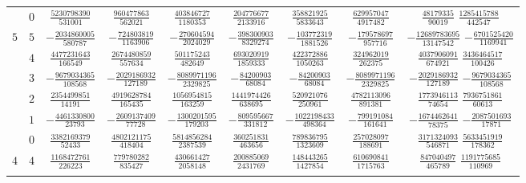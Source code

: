 \begin{table}
\begin{center}
\begin{tabular}{ccccccccc}
           &  $0$  &  $ \frac{ 5230798390}{ 531001}$  &  $ \frac{  960477863}{  562021}$  &  $ \frac{ 403846727}{ 1180353}$  &  $ \frac{ 204776677}{ 2133916}$  &  $ \frac{ 358821925}{ 5833643}$  &  $ \frac{ 629957047}{ 4917482} $  &  $ \frac{   48179335}{   90019}$  $ \frac{ 1285415788}{ 442547}$  \\ \addlinespace
      $5$  &  $5$  &  $-\frac{ 2034860005}{ 580787}$  &  $-\frac{  724803819}{ 1163906}$  &  $-\frac{ 270604594}{ 2024029}$  &  $-\frac{ 398300903}{ 8329274}$  &  $-\frac{ 103772319}{ 1881526}$  &  $-\frac{ 179578697}{  957716} $  &  $-\frac{12689783695}{13147542}$  $-\frac{ 6701525420}{1169941}$  \\ \addlinespace
           &  $4$  &  $ \frac{ 4477231643}{ 166549}$  &  $ \frac{ 2674480859}{  557634}$  &  $ \frac{ 501175243}{  482649}$  &  $ \frac{ 693020919}{ 1859333}$  &  $ \frac{ 422372886}{ 1050263}$  &  $ \frac{ 324962019}{  262375} $  &  $ \frac{ 4037906091}{  674921}$  $ \frac{ 3436464517}{ 100426}$  \\ \addlinespace
           &  $3$  &  $-\frac{ 9679034365}{ 108568}$  &  $-\frac{ 2029186932}{  127189}$  &  $-\frac{8089971196}{ 2329825}$  &  $-\frac{  84200903}{   68084}$  &  $-\frac{  84200903}{   68084}$  &  $-\frac{8089971196}{ 2329825} $  &  $-\frac{ 2029186932}{  127189}$  $-\frac{ 9679034365}{ 108568}$  \\ \addlinespace
           &  $2$  &  $ \frac{ 2354499851}{  14191}$  &  $ \frac{ 4919628784}{  165435}$  &  $ \frac{1056954815}{  163259}$  &  $ \frac{1441974426}{  638695}$  &  $ \frac{ 520921076}{  250961}$  &  $ \frac{4782113096}{  891381} $  &  $ \frac{ 1773946113}{   74654}$  $ \frac{ 7936751861}{  60613}$  \\ \addlinespace
           &  $1$  &  $-\frac{ 4461330800}{  23793}$  &  $-\frac{ 2609137409}{   77728}$  &  $-\frac{1300201595}{  179203}$  &  $-\frac{ 809595667}{  331812}$  &  $-\frac{1022198433}{  498364}$  &  $-\frac{ 799191084}{  161641} $  &  $-\frac{ 1674462641}{   78375}$  $-\frac{ 2087501693}{  17871}$  \\ \addlinespace
           &  $0$  &  $ \frac{ 3382169379}{  52433}$  &  $ \frac{ 4802121175}{  418404}$  &  $ \frac{5814856284}{ 2387539}$  &  $ \frac{ 360251831}{  463656}$  &  $ \frac{ 789836795}{ 1323609}$  &  $ \frac{ 257028097}{  188691} $  &  $ \frac{ 3171324093}{  546871}$  $ \frac{ 5633451919}{ 178362}$  \\ \addlinespace
      $4$  &  $4$  &  $ \frac{ 1168472761}{ 226223}$  &  $ \frac{  779780282}{  835427}$  &  $ \frac{ 430661427}{ 2058148}$  &  $ \frac{ 200885069}{ 2431769}$  &  $ \frac{ 148443265}{ 1427854}$  &  $ \frac{ 610690841}{ 1715763} $  &  $ \frac{  847040497}{  465789}$  $ \frac{ 1191775685}{ 110969}$  \\ \addlinespace

\end{tabular}
\end{center}
\end{table}
